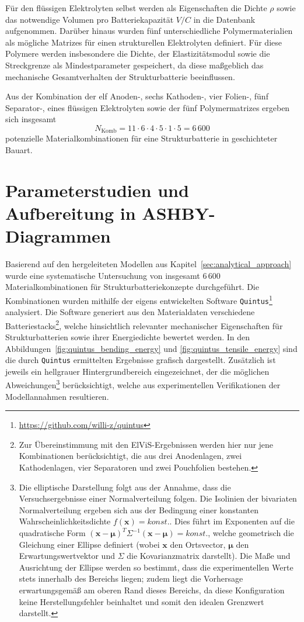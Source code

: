 Für den flüssigen Elektrolyten selbst werden als Eigenschaften die Dichte $\rho$ sowie das notwendige Volumen pro Batteriekapazität $V/C$ in die Datenbank aufgenommen. Darüber hinaus wurden fünf unterschiedliche Polymermaterialien als mögliche Matrizes für einen strukturellen Elektrolyten definiert. Für diese Polymere werden insbesondere die Dichte, der Elastizitätsmodul sowie die Streckgrenze als Mindestparameter gespeichert, da diese maßgeblich das mechanische Gesamtverhalten der Strukturbatterie beeinflussen.

Aus der Kombination der elf Anoden-, sechs Kathoden-, vier Folien-, fünf Separator-, eines flüssigen Elektrolyten sowie der fünf Polymermatrizes ergeben sich insgesamt
\begin{equation}
N_\mathrm{Komb} = 11 \cdot 6 \cdot 4 \cdot 5 \cdot 1 \cdot 5 = 6\,600
\end{equation}
potenzielle Materialkombinationen für eine Strukturbatterie in geschichteter Bauart. 


\section{Parameterstudien und Aufbereitung in ASHBY-Diagrammen}

Basierend auf den hergeleiteten Modellen aus Kapitel~\ref{sec:analytical_approach} wurde eine systematische Untersuchung von insgesamt 6\,600 Materialkombinationen für Strukturbatteriekonzepte durchgeführt. Die Kombinationen wurden mithilfe der eigens entwickelten Software \texttt{Quintus}\footnote{\url{https://github.com/willi-z/quintus}}~\cite{zschiebsch2024computational} analysiert. Die Software generiert aus den Materialdaten verschiedene Batteriestacks\footnote{Zur Übereinstimmung mit den ElViS-Ergebnissen werden hier nur jene Kombinationen berücksichtigt, die aus drei Anodenlagen, zwei Kathodenlagen, vier Separatoren und zwei Pouchfolien bestehen.}, welche hinsichtlich relevanter mechanischer Eigenschaften für Strukturbatterien sowie ihrer Energiedichte bewertet werden. In den Abbildungen~\ref{fig:quintus_bending_energy} und \ref{fig:quintus_tensile_energy} sind die durch \texttt{Quintus} ermittelten Ergebnisse grafisch dargestellt. 
Zusätzlich ist jeweils ein hellgrauer Hintergrundbereich eingezeichnet, der die möglichen Abweichungen\footnote{Die elliptische Darstellung folgt aus der Annahme, dass die Versuchsergebnisse einer Normalverteilung folgen. Die Isolinien der bivariaten Normalverteilung ergeben sich aus der Bedingung einer konstanten Wahrscheinlichkeitsdichte $f(\mathbf{x}) = konst.$. Dies führt im Exponenten auf die quadratische Form $(\mathbf{x}-\boldsymbol{\mu})^T \Sigma^{-1} (\mathbf{x}-\boldsymbol{\mu}) = konst.$, welche geometrisch die Gleichung einer Ellipse definiert (wobei $\mathbf{x}$ den Ortsvector, $\boldsymbol{\mu}$ den Erwartungswertvektor und $\Sigma$ die Kovarianzmatrix darstellt). Die Maße und Ausrichtung der Ellipse werden so bestimmt, dass die experimentellen Werte stets innerhalb des Bereichs liegen; zudem liegt die Vorhersage erwartungsgemäß am oberen Rand dieses Bereichs, da diese Konfiguration keine Herstellungsfehler beinhaltet und somit den idealen Grenzwert darstellt.} berücksichtigt, welche aus experimentellen Verifikationen der Modellannahmen resultieren.


